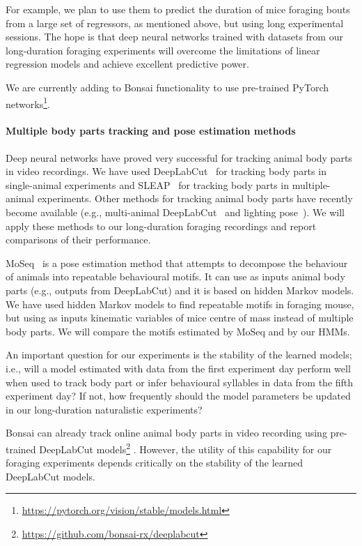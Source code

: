 For example, we plan to use them to predict the duration of mice foraging bouts from a
large set of regressors, as mentioned above, but using long experimental
sessions. The hope is that deep neural networks trained with datasets
from our long-duration foraging experiments will overcome the limitations of
linear regression models and achieve excellent predictive power.

We are currently adding to Bonsai functionality to use pre-trained PyTorch
networks\footnote{\url{https://pytorch.org/vision/stable/models.html}}.

\paragraph{Multiple body parts tracking and pose estimation methods}

Deep neural networks have proved very successful for tracking animal body parts
in video recordings.
%
We have used DeepLabCut~\citep{mathisEtAl18} for tracking body parts in
single-animal experiments and SLEAP~\citep{pereiraEtAl22} for tracking body
parts in multiple-animal experiments. Other methods for tracking animal body parts have
recently become available (e.g., multi-animal DeepLabCut~\citep{lauerEtAl22}
and lighting pose~\citep{bidermanEtAl23}).
%
We will apply these methods to our long-duration foraging recordings and report
comparisons of their performance.

MoSeq~\cite{wiltschkoEtAl15} is a pose estimation method that attempts to
decompose the behaviour of animals into
repeatable behavioural motifs. It can use as inputs animal body parts (e.g.,
outputs from DeepLabCut) and it is based on hidden Markov models. We have used
hidden Markov models to find repeatable motifs in foraging mouse, but using
as inputs kinematic variables of mice centre of mass instead of multiple body
parts.
%
We will compare the motifs estimated by MoSeq and by our HMMs.

An important question for our experiments is the stability of the learned
models; i.e., will a model estimated with data from the first experiment day
perform well when used to track body part or infer behavioural syllables in data
from the fifth experiment day? If not, how frequently should the model
parameters be updated in our long-duration naturalistic experiments?

Bonsai can already track online animal body parts in video recording using
pre-trained DeepLabCut
models\footnote{\url{https://github.com/bonsai-rx/deeplabcut}}
\citep{kaneEtAl20}. However, the utility of this capability for our foraging
experiments depends critically on the stability of the learned DeepLabCut
models.


